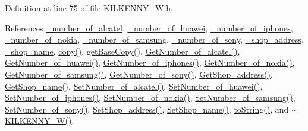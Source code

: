 Definition at line \hyperlink{_k_i_l_k_e_n_n_y___w_8h_source_l00075}{75} of file \hyperlink{_k_i_l_k_e_n_n_y___w_8h_source}{K\+I\+L\+K\+E\+N\+N\+Y\+\_\+\+W.\+h}.



References \hyperlink{_k_i_l_k_e_n_n_y___w_8h_source_l00116}{\+\_\+number\+\_\+of\+\_\+alcatel}, \hyperlink{_k_i_l_k_e_n_n_y___w_8h_source_l00114}{\+\_\+number\+\_\+of\+\_\+huawei}, \hyperlink{_k_i_l_k_e_n_n_y___w_8h_source_l00111}{\+\_\+number\+\_\+of\+\_\+iphones}, \hyperlink{_k_i_l_k_e_n_n_y___w_8h_source_l00115}{\+\_\+number\+\_\+of\+\_\+nokia}, \hyperlink{_k_i_l_k_e_n_n_y___w_8h_source_l00112}{\+\_\+number\+\_\+of\+\_\+samsung}, \hyperlink{_k_i_l_k_e_n_n_y___w_8h_source_l00113}{\+\_\+number\+\_\+of\+\_\+sony}, \hyperlink{_k_i_l_k_e_n_n_y___w_8h_source_l00109}{\+\_\+shop\+\_\+address}, \hyperlink{_k_i_l_k_e_n_n_y___w_8h_source_l00110}{\+\_\+shop\+\_\+name}, \hyperlink{_k_i_l_k_e_n_n_y___w_8cpp_source_l00035}{copy()}, \hyperlink{_k_i_l_k_e_n_n_y___w_8cpp_source_l00022}{get\+Base\+Copy()}, \hyperlink{_k_i_l_k_e_n_n_y___w_8cpp_source_l00073}{Get\+Number\+\_\+of\+\_\+alcatel()}, \hyperlink{_k_i_l_k_e_n_n_y___w_8cpp_source_l00089}{Get\+Number\+\_\+of\+\_\+huawei()}, \hyperlink{_k_i_l_k_e_n_n_y___w_8cpp_source_l00113}{Get\+Number\+\_\+of\+\_\+iphones()}, \hyperlink{_k_i_l_k_e_n_n_y___w_8cpp_source_l00081}{Get\+Number\+\_\+of\+\_\+nokia()}, \hyperlink{_k_i_l_k_e_n_n_y___w_8cpp_source_l00105}{Get\+Number\+\_\+of\+\_\+samsung()}, \hyperlink{_k_i_l_k_e_n_n_y___w_8cpp_source_l00097}{Get\+Number\+\_\+of\+\_\+sony()}, \hyperlink{_k_i_l_k_e_n_n_y___w_8cpp_source_l00129}{Get\+Shop\+\_\+address()}, \hyperlink{_k_i_l_k_e_n_n_y___w_8cpp_source_l00121}{Get\+Shop\+\_\+name()}, \hyperlink{_k_i_l_k_e_n_n_y___w_8cpp_source_l00069}{Set\+Number\+\_\+of\+\_\+alcatel()}, \hyperlink{_k_i_l_k_e_n_n_y___w_8cpp_source_l00085}{Set\+Number\+\_\+of\+\_\+huawei()}, \hyperlink{_k_i_l_k_e_n_n_y___w_8cpp_source_l00109}{Set\+Number\+\_\+of\+\_\+iphones()}, \hyperlink{_k_i_l_k_e_n_n_y___w_8cpp_source_l00077}{Set\+Number\+\_\+of\+\_\+nokia()}, \hyperlink{_k_i_l_k_e_n_n_y___w_8cpp_source_l00101}{Set\+Number\+\_\+of\+\_\+samsung()}, \hyperlink{_k_i_l_k_e_n_n_y___w_8cpp_source_l00093}{Set\+Number\+\_\+of\+\_\+sony()}, \hyperlink{_k_i_l_k_e_n_n_y___w_8cpp_source_l00125}{Set\+Shop\+\_\+address()}, \hyperlink{_k_i_l_k_e_n_n_y___w_8cpp_source_l00117}{Set\+Shop\+\_\+name()}, \hyperlink{_k_i_l_k_e_n_n_y___w_8cpp_source_l00062}{to\+String()}, and \hyperlink{_k_i_l_k_e_n_n_y___w_8cpp_source_l00012}{$\sim$\+K\+I\+L\+K\+E\+N\+N\+Y\+\_\+\+W()}.


